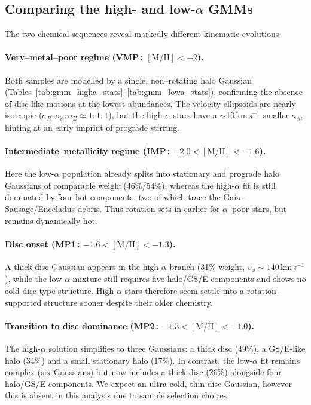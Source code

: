 \documentclass[a4paper,12pt]{article}
\begin{document}
\subsection{Comparing the high- and low-\texorpdfstring{$\alpha$}{α} GMMs}
\label{subsec:gmm_comparison}

The two chemical sequences reveal markedly different kinematic evolutions.

\paragraph{Very–metal–poor regime (VMP\,: $[\mathrm{M/H}]<-2$).}
Both samples are modelled by a single, non–rotating halo Gaussian
(Tables~\ref{tab:gmm_higha_stats}--\ref{tab:gmm_lowa_stats}),
confirming the absence of disc‐like motions at the lowest abundances.
The velocity ellipsoids are nearly isotropic
($\sigma_{R}\!:\!\sigma_{\phi}\!:\!\sigma_{Z}\!\simeq\!1\!:\!1\!:\!1$),
but the high-$\alpha$ stars have a $\sim$10\,km\,s$^{-1}$ smaller
$\sigma_{\phi}$, hinting at an early imprint of prograde stirring.

\paragraph{Intermediate–metallicity regime (IMP\,: $-2.0<[\mathrm{M/H}]<-1.6$).}
Here the low-$\alpha$ population already splits into
stationary and prograde halo Gaussians of comparable
weight\,(46\%/54\%), whereas the high-$\alpha$ fit is
still dominated by four hot components, two of which trace the
Gaia–Sausage/Enceladus debris.  Thus rotation sets in
earlier for $\alpha$–poor stars, but remains dynamically hot.

\paragraph{Disc onset (MP1\,: $-1.6<[\mathrm{M/H}]<-1.3$).}
A thick-disc Gaussian appears in the high-$\alpha$ branch
(31\% weight, $v_\phi\!\sim\!140$\,km\,s$^{-1}$), while the
low-$\alpha$ mixture still requires five halo/GS/E components and shows no
cold disc type structure.  High-$\alpha$ stars therefore seem settle into a
rotation‐supported structure sooner despite their older
chemistry.

\paragraph{Transition to disc dominance (MP2\,: $-1.3<[\mathrm{M/H}]<-1.0$).}
The high-$\alpha$ solution simplifies to three Gaussians: a thick disc
(49\%), a GS/E-like halo (34\%) and a small stationary
halo (17\%).  In contrast, the low-$\alpha$ fit remains
complex (six Gaussians) but now includes a thick disc
(26\%) alongside four halo/GS/E components. We expect an ultra-cold,
thin-disc Gaussian, however this is absent in this analysis due to sample selection choices.
\end{document}
